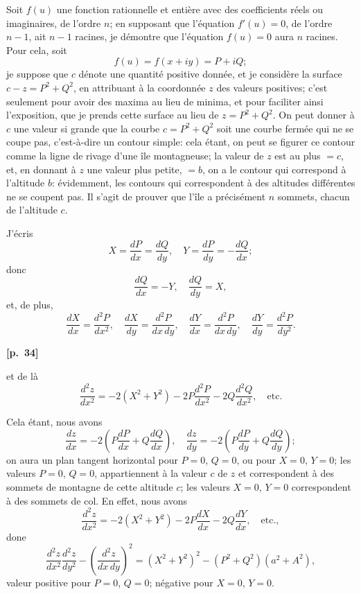 \documentclass[11pt,a4paper]{book}
\begin{document}
Soit $f(u)$ une fonction rationnelle et enti\`ere avec des coefficients r\'eels ou imaginaires, de l'ordre $n$; en supposant que l'\'equation $f'(u) = 0$, de l'ordre $n - 1$, ait $n - 1$ racines, je d\'emontre que l'\'equation $f(u) = 0$ aura $n$ racines. Pour cela, soit
$$
f(u) = f(x + iy) = P + iQ;
$$
je suppose que $c$ d\'enote une quantit\'e positive donn\'ee, et je consid\`ere la surface $c - z = P^2 + Q^2$, en attribuant \`a la coordonn\'ee $z$ des valeurs positives; c'est seulement pour avoir des maxima au lieu de minima, et pour faciliter ainsi l'exposition, que je prends cette surface au lieu de $z = P^2 + Q^2$. On peut donner \`a $c$ une valeur si grande que la courbe $c = P^2 + Q^2$ soit une courbe ferm\'ee qui ne se coupe pas, c'est-\`a-dire un contour simple: cela \'etant, on peut se figurer ce contour comme la ligne de rivage d'une \^ile montagneuse; la valeur de $z$ est au plus $= c$, et, en donnant \`a $z$ une valeur plus petite, $= b$, on a le contour qui correspond \`a l'altitude $b$: \'evidemment, les contours qui correspondent \`a des altitudes diff\'erentes ne se coupent pas. Il s'agit de prouver que l'\^ile a pr\'ecis\'ement $n$ sommets, chacun de l'altitude $c$.

J'\'ecris
$$
X = \frac{dP}{dx} = \frac{dQ}{dy}, \quad Y = \frac{dP}{dy} = -\frac{dQ}{dx};
$$
donc
$$
\frac{dQ}{dx} = -Y, \quad \frac{dQ}{dy} = X,
$$
et, de plus,
$$
\frac{dX}{dx} = \frac{d^2 P}{dx^2}, \quad \frac{dX}{dy} = \frac{d^2 P}{dx\,dy}, \quad \frac{dY}{dx} = \frac{d^2 P}{dx\,dy}, \quad \frac{dY}{dy} = \frac{d^2 P}{dy^2}.
$$

\vspace{0.5em}
\noindent\textbf{[p.\ 34]}

et de l\`a
$$
\frac{d^2 z}{dx^2} = -2(X^2 + Y^2) - 2P\frac{d^2 P}{dx^2} - 2Q\frac{d^2 Q}{dx^2}, \quad \text{etc.}
$$

Cela \'etant, nous avons
$$
\frac{dz}{dx} = -2\left(P\frac{dP}{dx} + Q\frac{dQ}{dx}\right), \quad \frac{dz}{dy} = -2\left(P\frac{dP}{dy} + Q\frac{dQ}{dy}\right);
$$
on aura un plan tangent horizontal pour $P = 0$, $Q = 0$, ou pour $X = 0$, $Y = 0$; les valeurs $P = 0$, $Q = 0$, appartiennent \`a la valeur $c$ de $z$ et correspondent \`a des sommets de montagne de cette altitude $c$; les valeurs $X = 0$, $Y = 0$ correspondent \`a des sommets de col. En effet, nous avons
$$
\frac{d^2 z}{dx^2} = -2(X^2 + Y^2) - 2P\frac{dX}{dx} - 2Q\frac{dY}{dx}, \quad \text{etc.},
$$
done
$$
\frac{d^2 z}{dx^2}\frac{d^2 z}{dy^2} - \left(\frac{d^2 z}{dx\,dy}\right)^2 = (X^2 + Y^2)^2 - (P^2 + Q^2)(a^2 + A^2),
$$
valeur positive pour $P = 0$, $Q = 0$; n\'egative pour $X = 0$, $Y = 0$.
\end{document}
